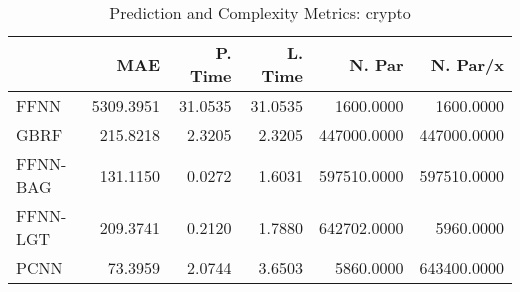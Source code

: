 \begin{table}
\centering
\caption{Prediction and Complexity Metrics: crypto}
\label{tab__crypto__Fix_Neurons_QTrue}
\begin{tabular}{lrrrrr}
\toprule
{} &       MAE &  P. Time &  L. Time &      N. Par &    N. Par/x \\
\midrule
FFNN     & 5309.3951 &  31.0535 &  31.0535 &   1600.0000 &   1600.0000 \\
GBRF     &  215.8218 &   2.3205 &   2.3205 & 447000.0000 & 447000.0000 \\
FFNN-BAG &  131.1150 &   0.0272 &   1.6031 & 597510.0000 & 597510.0000 \\
FFNN-LGT &  209.3741 &   0.2120 &   1.7880 & 642702.0000 &   5960.0000 \\
PCNN     &   73.3959 &   2.0744 &   3.6503 &   5860.0000 & 643400.0000 \\
\bottomrule
\end{tabular}
\end{table}
